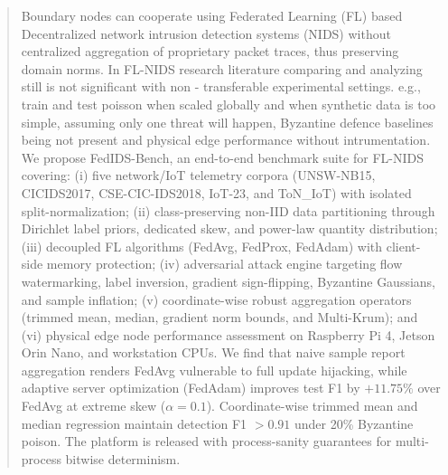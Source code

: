 \documentclass[runningheads]{llncs}
\begin{document}
\begin{abstract}
Boundary nodes can cooperate using Federated Learning (FL) based Decentralized network intrusion detection systems (NIDS) without centralized aggregation of proprietary packet traces, thus preserving domain norms. In FL-NIDS research literature comparing and analyzing still is not significant with non - transferable experimental settings. e.g., train and test poisson when scaled globally and when synthetic data is too simple, assuming only one threat will happen, Byzantine defence baselines being not present and physical edge performance without intrumentation. We propose FedIDS-Bench, an end-to-end benchmark suite for FL-NIDS covering: (i) five network/IoT telemetry corpora (UNSW-NB15, CICIDS2017, CSE-CIC-IDS2018, IoT-23, and ToN\_IoT) with isolated split-normalization; (ii) class-preserving non-IID data partitioning through Dirichlet label priors, dedicated skew, and power-law quantity distribution; (iii) decoupled FL algorithms (FedAvg, FedProx, FedAdam) with client-side memory protection; (iv) adversarial attack engine targeting flow watermarking, label inversion, gradient sign-flipping, Byzantine Gaussians, and sample inflation; (v) coordinate-wise robust aggregation operators (trimmed mean, median, gradient norm bounds, and Multi-Krum); and (vi) physical edge node performance assessment on Raspberry Pi 4, Jetson Orin Nano, and workstation CPUs. We find that naive sample report aggregation renders FedAvg vulnerable to full update hijacking, while adaptive server optimization (FedAdam) improves test F1 by $+11.75\%$ over FedAvg at extreme skew ($\alpha = 0.1$). Coordinate-wise trimmed mean and median regression maintain detection F1 $> 0.91$ under 20\% Byzantine poison. The platform is released with process-sanity guarantees for multi-process bitwise determinism.

\end{abstract}
\end{document}

